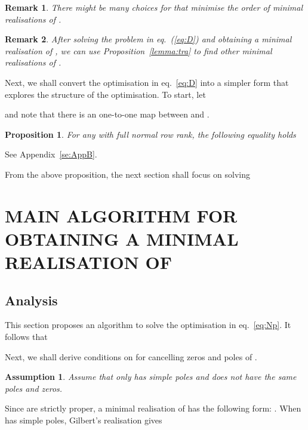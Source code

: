 \documentclass[twocolumn,12pt]{autart}
\theoremstyle{plain}
\newtheorem{proposition}{Proposition}
\newtheorem{remark}{Remark}
\newtheorem{assumption}{Assumption}
\newenvironment{proof}[1][Proof]{\begin{trivlist} \item[\hskip \labelsep {\bfseries #1}]}{\end{trivlist}}
\begin{document}
\begin{remark}
There might be many choices for  that minimise
the order of minimal realisations of .
\end{remark}

\begin{remark}
After solving the problem in eq.~(\ref{eq:D}) and obtaining a minimal realisation of , we can use Proposition~\ref{lemma:tra} to find other minimal realisations of . 
\end{remark}
 



Next, we shall convert the optimisation in eq.~\eqref{eq:D} into a simpler form that explores the structure of the optimisation. To start,  
let 

and note that there is an one-to-one map between  and .

\begin{proposition}\label{prop:convert}
For any  with full normal row rank, the following equality holds

\end{proposition}
\begin{proof}
See Appendix~\ref{se:AppB}. 
\end{proof}

From the above proposition, the next section shall focus on solving







\section{MAIN ALGORITHM FOR OBTAINING A MINIMAL REALISATION OF }
\subsection{Analysis}\label{se:4.1}
This section proposes an algorithm to solve the optimisation in eq.~\eqref{eq:Np}. It follows that

Next, we shall derive conditions on  for cancelling zeros and poles of . 
\begin{assumption}\label{ass:1}
Assume that  only has simple poles and does not have the same poles and zeros. 
\end{assumption}


Since  are strictly proper, a minimal realisation of  has the following form: . When  has  simple poles, Gilbert's realisation \cite{gilbert} gives
\end{document}
